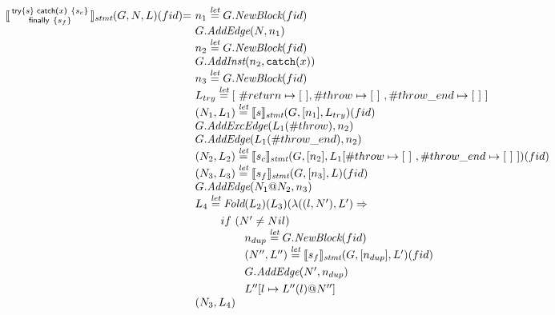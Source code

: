 \[
\begin{array}{l@{}l@{~}l}
\transfun{\irtryfull{s}{x}{s_c}{s_f}}_{\emph{stmt}}(G,N,L)(fid) & = &
	n_1 \letval G.\emph{NewBlock}(fid)\\
	& & G.\emph{AddEdge}(N,n_1)\\
	& & n_2 \letval G.\emph{NewBlock}(fid)\\
	& & G.\emph{AddInst}(n_2,\TT{catch}(x))\\
	& & n_3 \letval G.\emph{NewBlock}(fid)\\
	& & L_{try} \letval [\ \#return \mapsto [\ ], \#throw \mapsto [\ ]\ , \#throw\_end \mapsto [\ ]\ ] \\
	& & (N_1,L_1) \letval \transfun{s}_{\emph{stmt}}(G,[n_1],L_{try})(fid)\\
	& & G.\emph{AddExcEdge}(L_1(\#throw),n_2)\\
	& & G.\emph{AddEdge}(L_1(\#throw\_end),n_2)\\
	& & (N_2,L_2) \letval \transfun{s_c}_{\emph{stmt}}(G,[n_2],L_1[\#throw \mapsto [\ ]\ , \#throw\_end \mapsto [\ ]\ ])(fid)\\
	& & (N_3,L_3) \letval \transfun{s_f}_{\emph{stmt}}(G,[n_3],L)(fid)\\
	& & G.\emph{AddEdge}(N_1@N_2,n_3)\\
	& & L_4 \letval \Fold(L_2)(L_3)(\lambda((l,N'),L') \Rightarrow\\
	& & \phantom{L_3 \letval}if\ (N' \neq Nil)\\
	& & \phantom{L_3 \letval \Fold} n_{dup} \letval G.\emph{NewBlock}(fid)\\
	& & \phantom{L_3 \letval \Fold} (N'',L'') \letval \transfun{s_f}_{\emph{stmt}}(G,[n_{dup}],L')(fid)\\
	& & \phantom{L_3 \letval \Fold} G.\emph{AddEdge}(N',n_{dup})\\
	& & \phantom{L_3 \letval \Fold} L''[l \mapsto L''(l)@N'']\\
	& & (N_3,L_4)\\
	& & \\  
\end{array}
\]
\newpage
